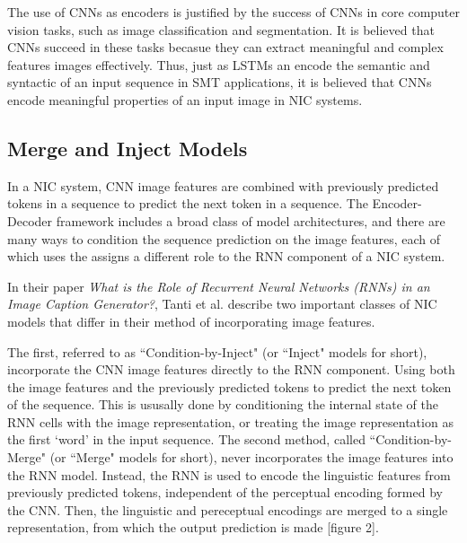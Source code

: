 \documentclass[letterpaper, 10 pt, conference]{ieeeconf}
\begin{document}
The use of CNNs as encoders is justified by the success of CNNs in core computer vision tasks, such as image classification and segmentation. It is believed that CNNs succeed in these tasks becasue they can extract meaningful and complex features images effectively. Thus, just as LSTMs an encode the semantic and syntactic of an input sequence in SMT applications, it is believed that CNNs encode meaningful properties of an input image in NIC systems.

\subsection{Merge and Inject Models}

In a NIC system, CNN image features are combined with previously predicted tokens in a sequence to predict the next token in a sequence. The Encoder-Decoder framework includes a broad class of model architectures, and there are many ways to condition the sequence prediction on the image features, each of which uses the assigns a different role to the RNN component of a NIC system. 

In their paper \emph{What is the Role of Recurrent Neural Networks (RNNs) in an Image Caption Generator?}, 
Tanti et al. describe two important classes of NIC models that differ in their method of incorporating image features. 

The first, referred to as ``Condition-by-Inject" (or ``Inject" models for short), incorporate the CNN image features directly to the RNN component. Using both the image features and the previously predicted tokens to predict the next token of the sequence. This is ususally done by conditioning the internal state of the RNN cells with the image representation, or treating the image representation as the first `word' in the input sequence. The second method, called ``Condition-by-Merge" (or ``Merge" models for short), never incorporates the image features into the RNN model. Instead, the RNN is used to encode the linguistic features from previously predicted tokens, independent of the perceptual encoding formed by the CNN. Then, the linguistic and pereceptual encodings are merged to a single representation, from which the output prediction is made [figure 2]. 
\end{document}
